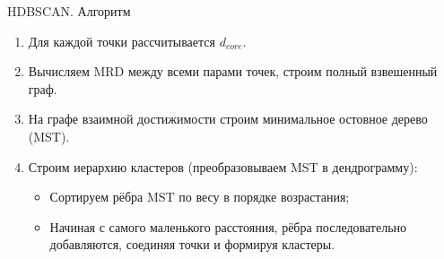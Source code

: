 \documentclass[unicode, notheorems, handout]{beamer}
\begin{document}
\begin{frame}{HDBSCAN. Алгоритм}
    \begin{enumerate}
        \item Для каждой точки рассчитывается $d_{core}$.
        
        \item  Вычисляем MRD между всеми парами точек, строим полный взвешенный граф.

        \item На графе взаимной достижимости строим минимальное остовное дерево (MST).

        \item Строим иерархию кластеров (преобразовываем MST в дендрограмму):

        \begin{itemize}
            \item Сортируем рёбра MST по весу в порядке возрастания;
            \item Начиная с самого маленького расстояния, рёбра последовательно добавляются, соединяя точки и формируя кластеры.
        \end{itemize}
    \end{enumerate}
\end{frame}
\end{document}
